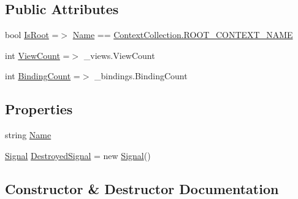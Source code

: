 \subsection*{Public Attributes}
\begin{DoxyCompactItemize}
\item 
bool \mbox{\hyperlink{classcp_games_1_1core_1_1_rapid_m_v_c_1_1impl_1_1_context_a680ba0ad31bb053424a5686c8677b8e5}{Is\+Root}} =$>$ \mbox{\hyperlink{classcp_games_1_1core_1_1_rapid_m_v_c_1_1impl_1_1_context_a01651ef919129bf3f518ec88311e978f}{Name}} == \mbox{\hyperlink{classcp_games_1_1core_1_1_rapid_m_v_c_1_1impl_1_1_context_collection_a86300874483a67e28fba243d52f6e05a}{Context\+Collection.\+R\+O\+O\+T\+\_\+\+C\+O\+N\+T\+E\+X\+T\+\_\+\+N\+A\+ME}}
\item 
int \mbox{\hyperlink{classcp_games_1_1core_1_1_rapid_m_v_c_1_1impl_1_1_context_a0ac117354fa37b67325a31144893cc96}{View\+Count}} =$>$ \+\_\+views.\+View\+Count
\item 
int \mbox{\hyperlink{classcp_games_1_1core_1_1_rapid_m_v_c_1_1impl_1_1_context_aeb686caac63068142940fb6a5ad2220c}{Binding\+Count}} =$>$ \+\_\+bindings.\+Binding\+Count
\end{DoxyCompactItemize}
\subsection*{Properties}
\begin{DoxyCompactItemize}
\item 
string \mbox{\hyperlink{classcp_games_1_1core_1_1_rapid_m_v_c_1_1impl_1_1_context_a01651ef919129bf3f518ec88311e978f}{Name}}
\item 
\mbox{\hyperlink{classcp_games_1_1core_1_1_rapid_m_v_c_1_1_signal}{Signal}} \mbox{\hyperlink{classcp_games_1_1core_1_1_rapid_m_v_c_1_1impl_1_1_context_a9faf69788cd735330d4e4ff57bcadbe7}{Destroyed\+Signal}} = new \mbox{\hyperlink{classcp_games_1_1core_1_1_rapid_m_v_c_1_1_signal}{Signal}}()
\end{DoxyCompactItemize}


\subsection{Constructor \& Destructor Documentation}
\mbox{\label{classcp_games_1_1core_1_1_rapid_m_v_c_1_1impl_1_1_context_a5f870e38ed7efdf3fe02ebe0f6052fa2}} 
